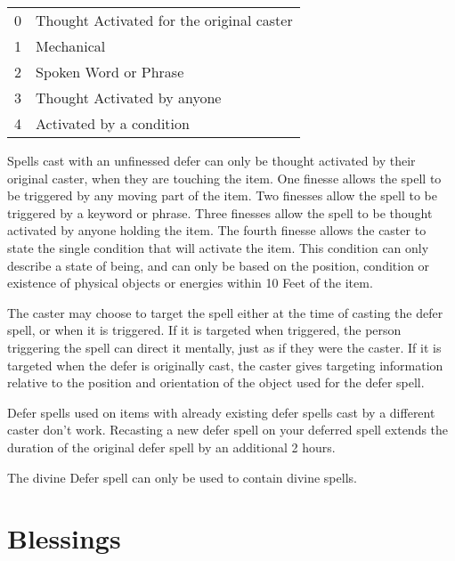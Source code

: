 \begin{tabular}{@{} l l}
0 & Thought Activated for the original caster\\
1 & Mechanical\\
2 & Spoken Word or Phrase\\
3 & Thought Activated by anyone\\
4 & Activated by a condition
\end{tabular}

Spells cast with an unfinessed defer can only be thought activated by their original caster, when they are touching the item. One finesse allows the spell to be triggered by any moving part of the item. Two finesses allow the spell to be triggered by a keyword or phrase. Three finesses allow the spell to be thought activated by anyone holding the item. The fourth finesse allows the caster to state the single condition that will activate the item. This condition can only describe a state of being, and can only be based on the position, condition or existence of physical objects or energies within 10 Feet of the item.

The caster may choose to target the spell either at the time of casting the defer spell, or when it is triggered. If it is targeted when triggered, the person triggering the spell can direct it mentally, just as if they were the caster. If it is targeted when the defer is originally cast, the caster gives targeting information relative to the position and orientation of the object used for the defer spell.

Defer spells used on items with already existing defer spells cast by a different caster don’t work. Recasting a new defer spell on your deferred spell extends the duration of the original defer spell by an additional 2 hours.

The divine Defer spell can only be used to contain divine spells.

\pagebreak

\section{Blessings}

